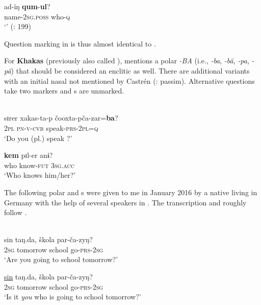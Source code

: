     \ex
    \gll ad-ïŋ \textbf{{qum}}-\textbf{{ul}}?\\
    name-2\textsc{sg}.\textsc{poss}  who-\textsc{q}\\
    \glt ‘’ (\citealt{Schönig1993}: 199)
    \z
    \z

\noindent Question marking in  is thus almost identical to .

For \textbf{Khakas} (previously also called ), \cite[71]{Castrén1857b} mentions a polar  \textit{-BA} (i.e., \textit{-ba}, \textit{-bä}, \textit{-pa}, \textit{-pä}) that should be considered an enclitic as well. There are additional variants with an initial nasal not mentioned by Castrén (\citealt{Anderson1998}: passim). Alternative questions take two markers and s are unmarked.

\ea%
    \label{ex:turk:48}
    \\
    \ea
    \gll sɪrer  xakas-ta-p  čooxta-pča-zar=\textbf{{ba}}?\\
    2\textsc{pl}  \textsc{pn}-\textsc{v}-\textsc{cvb}  speak-\textsc{prs}-2\textsc{pl=q}\\
    \glt ‘Do you (pl.) speak ?’
    
    \ex
    \gll \textbf{{kem}} pɪl-er    anɨ?\\
    who  know-\textsc{fut}  3\textsc{sg}.\textsc{acc}\\
    \glt ‘Who knows him/her?’ \citep[87]{Anderson1998}
    \z
    \z

The following polar and s were given to me in January 2016 by a native  living in Germany with the help of several  speakers in . The transcription and  roughly follow \citet{Anderson1998}.

\ea%
    \label{ex:turk:49}
    \\
    \ea
    \gll sin    taŋ.da,    škola    par-ča-zyŋ?\\
    2\textsc{sg}    tomorrow  school    go-\textsc{prs}-2\textsc{sg}\\
    \glt ‘Are you going to school tomorrow?’
    
    \ex
    \gll \uline{sin}    taŋ.da,    škola    par-ča-zyŋ?\\
    2\textsc{sg}    tomorrow  school    go-\textsc{prs}-2\textsc{sg}\\
    \glt ‘Is it \textit{you} who is going to school tomorrow?’
    
